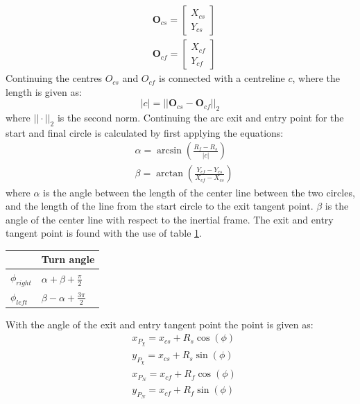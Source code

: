 \begin{align}
& \mathbf{O}_{cs} =
\begin{bmatrix}
X_{cs} \\
Y_{cs}
\end{bmatrix} \\
& \mathbf{O}_{cf} =
\begin{bmatrix}
X_{cf} \\
Y_{cf}
\end{bmatrix}
\end{align}
Continuing the centres $O_{cs}$ and $O_{cf}$ is connected with a centreline $c$, where the length is given as:
\begin{equation}
|c| = ||\mathbf{O}_{cs} - \mathbf{O}_{cf}||_2
\end{equation}
where $||\cdot||_2$ is the second norm. Continuing the arc exit and entry point for the start and final circle is calculated by first applying the equations:
\begin{subequations}
\begin{align}
& \alpha = \arcsin\left(\frac{R_f-R_s}{|c|}\right) \\
& \beta = \arctan\left(\frac{Y_{cf}-Y_{cs}}{X_{cf}-X_{cs}}\right)
\end{align}
\end{subequations}
where $\alpha$ is the angle between the length of the center line between the two circles, and the length of the line from the start circle to the exit tangent point. $\beta$ is the angle of the center line with respect to the inertial frame. The exit and entry tangent point is found with the use of table \ref{Tb:ExitEntryTangent}.
\begin{table}[H]\label{Tb:ExitEntryTangent}
\begin{center}
\begin{tabular}{ | l | | l |}
\hline
& \textbf{Turn angle} \\ \hline
$\phi_{right}$ & $\alpha + \beta + \frac{\pi}{2}$ \\
$\phi_{left}$ & $\beta - \alpha + \frac{3\pi}{2}$ \\ \hline
\end{tabular}
\end{center}

\end{table}
With the angle of the exit and entry tangent point the point is given as:
\begin{subequations}
\begin{align}
& x_{P_\chi} = x_{cs} + R_s\cos(\phi) \\
& y_{P_\chi} = x_{cs} + R_s\sin(\phi) \\
& x_{P_N} = x_{cf} + R_f\cos(\phi) \\
& y_{P_N} = x_{cf} + R_f\sin(\phi)
\end{align}
\end{subequations}
